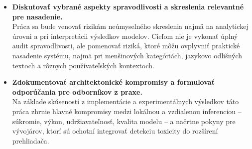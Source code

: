 \begin{itemize}
  \item \textbf{Diskutovať vybrané aspekty spravodlivosti a skreslenia relevantné pre nasadenie.}\\
  Práca sa bude venovať rizikám neúmyselného skreslenia najmä na analytickej úrovni a pri interpretácii výsledkov modelov. Cieľom nie je vykonať úplný audit spravodlivosti, ale pomenovať riziká, ktoré môžu ovplyvniť praktické nasadenie systému, najmä pri menšinových kategóriách, jazykovo odlišných textoch a rôznych používateľských kontextoch.
  \item \textbf{Zdokumentovať architektonické kompromisy a formulovať odporúčania pre odborníkov z praxe.}\\
  Na základe skúseností z implementácie a experimentálnych výsledkov táto práca zhrnie hlavné kompromisy medzi lokálnou a vzdialenou inferenciou – súkromie, výkon, udržiavateľnosť, kvalita modelu – a načrtne pokyny pre vývojárov, ktorí sú ochotní integrovať detekciu toxicity do rozšírení prehliadača.
\end{itemize}